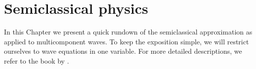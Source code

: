 
\chapter{Semiclassical physics}

In this Chapter we present a quick rundown of the semiclassical approximation as applied to multicomponent waves.
To keep the exposition simple, we will restrict ourselves to wave equations in one variable.
For more detailed descriptions, we refer to the book by \citet{tracy2014}.





